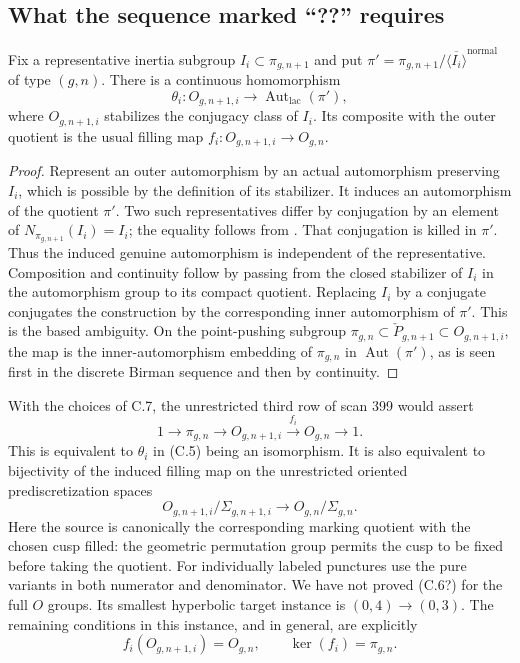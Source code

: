 \subsection{What the sequence marked ``??'' requires}

Fix a representative inertia subgroup $I_i\subset\pi_{g,n+1}$
and put $\pi'=\pi_{g,n+1}/\overline{\langle I_i\rangle}^{\mathrm{normal}}$
of type $(g,n)$.  There is a continuous homomorphism
\[
 \theta_i:O_{g,n+1,i}\longrightarrow
 \operatorname{Aut}_{\mathrm{lac}}(\pi'),
 \tag{C.5}
\]
where $O_{g,n+1,i}$ stabilizes the conjugacy class of $I_i$.
Its composite with the outer quotient is the usual filling map
$f_i:O_{g,n+1,i}\to O_{g,n}$.

\begin{proof}
Represent an outer automorphism by an actual automorphism
preserving $I_i$, which is possible by the definition of its
stabilizer.  It induces an automorphism of the quotient $\pi'$.
Two such representatives differ by conjugation by an element
of $N_{\pi_{g,n+1}}(I_i)=I_i$; the equality follows from
\citet[Proposition 3.6]{BoggiZalesskii2019BC}.  That conjugation
is killed in $\pi'$.  Thus the induced genuine automorphism is
independent of the representative.  Composition and continuity
follow by passing from the closed stabilizer of $I_i$ in the
automorphism group to its compact quotient.  Replacing $I_i$ by
a conjugate conjugates the construction by the corresponding
inner automorphism of $\pi'$.  This is the based ambiguity.
On the point-pushing subgroup
$\pi_{g,n}\subset\check P_{g,n+1}\subset O_{g,n+1,i}$,
the map is the inner-automorphism embedding of $\pi_{g,n}$ in
$\operatorname{Aut}(\pi')$, as is seen first in the discrete
Birman sequence and then by continuity.
\end{proof}

With the choices of C.7, the unrestricted third row of scan 399
would assert
\[
 1\longrightarrow\pi_{g,n}
 \longrightarrow O_{g,n+1,i}
 \xrightarrow{f_i}O_{g,n}\longrightarrow1.
 \tag{C.6?}
\]
This is equivalent to $\theta_i$ in (C.5) being an isomorphism.
It is also equivalent to bijectivity of the induced filling map
on the unrestricted oriented prediscretization spaces
\[
 O_{g,n+1,i}/\Sigma_{g,n+1,i}
 \longrightarrow O_{g,n}/\Sigma_{g,n}.
 \tag{C.7?}
\]
Here the source is canonically the corresponding marking
quotient with the chosen cusp filled: the geometric permutation
group permits the cusp to be fixed before taking the quotient.
For individually labeled punctures use the pure variants in
both numerator and denominator.  We have not proved (C.6?)
for the full $O$ groups.  Its smallest hyperbolic target instance
is $(0,4)\to(0,3)$.  The remaining conditions in this instance,
and in general, are explicitly
\[
 f_i(O_{g,n+1,i})=O_{g,n},\qquad
 \ker(f_i)=\pi_{g,n}.
\]

